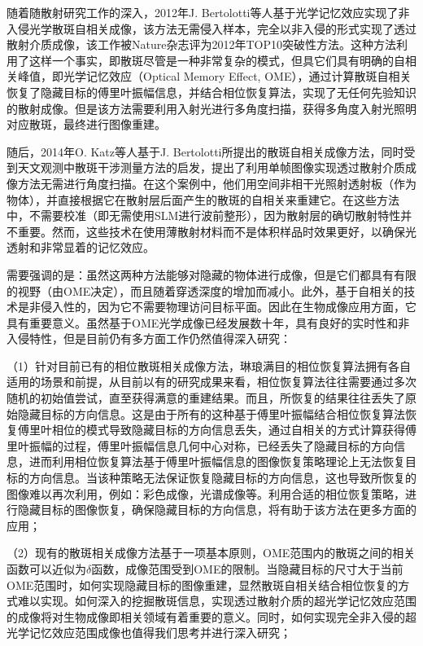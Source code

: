 随着随散射研究工作的深入，2012年J. Bertolotti等人\cite{bertolotti_non-invasive_2012}基于光学记忆效应实现了非入侵光学散斑自相关成像，该方法无需侵入样本，完全以非入侵的形式实现了透过散射介质成像，该工作被Nature杂志评为2012年TOP10突破性方法。这种方法利用了这样一个事实，即散斑尽管是一种非常复杂的模式，但具它们具有明确的自相关峰值，即光学记忆效应（Optical Memory Effect, OME）\cite{Freund1988}，通过计算散斑自相关恢复了隐藏目标的傅里叶振幅信息，并结合相位恢复算法，实现了无任何先验知识的散射成像。但是该方法需要利用入射光进行多角度扫描，获得多角度入射光照明对应散斑，最终进行图像重建。

随后，2014年O. Katz等人\cite{katz_non-invasive_2014}基于J. Bertolotti所提出的散斑自相关成像方法，同时受到天文观测中散斑干涉测量方法的启发，提出了利用单帧图像实现透过散射介质成像方法无需进行角度扫描。在这个案例中，他们用空间非相干光照射透射板（作为物体），并直接根据它在散射层后面产生的散斑的自相关来重建它。在这些方法中，不需要校准（即无需使用SLM进行波前整形），因为散射层的确切散射特性并不重要。然而，这些技术在使用薄散射材料而不是体积样品时效果更好，以确保光透射和非常显着的记忆效应。

需要强调的是：虽然这两种方法\cite{bertolotti_non-invasive_2012,katz_non-invasive_2014}能够对隐藏的物体进行成像，但是它们都具有有限的视野（由OME决定），而且随着穿透深度的增加而减小。此外，基于自相关的技术是非侵入性的，因为它不需要物理访问目标平面。因此在生物成像应用方面，它具有重要意义。虽然基于OME光学成像已经发展数十年，具有良好的实时性和非入侵特性，但是目前仍有多方面工作仍然值得深入研究：

（1）针对目前已有的相位散斑相关成像方法，琳琅满目的相位恢复算法拥有各自适用的场景和前提，从目前以有的研究成果来看，相位恢复算法往往需要通过多次随机的初始值尝试，直至获得满意的重建结果。而且，所恢复的结果往往丢失了原始隐藏目标的方向信息。这是由于所有的这种基于傅里叶振幅结合相位恢复算法恢复傅里叶相位的模式导致隐藏目标的方向信息丢失，通过自相关的方式计算获得傅里叶振幅的过程，傅里叶振幅信息几何中心对称，已经丢失了隐藏目标的方向信息，进而利用相位恢复算法基于傅里叶振幅信息的图像恢复策略理论上无法恢复目标的方向信息。当该种策略无法保证恢复隐藏目标的方向信息，这也导致所恢复的图像难以再次利用，例如：彩色成像，光谱成像等。利用合适的相位恢复策略，进行隐藏目标的图像恢复，确保隐藏目标的方向信息，将有助于该方法在更多方面的应用；

（2）现有的散斑相关成像方法基于一项基本原则，OME范围内的散斑之间的相关函数可以近似为$\delta$函数，成像范围受到OME的限制。当隐藏目标的尺寸大于当前OME范围时，如何实现隐藏目标的图像重建，显然散斑自相关结合相位恢复的方式难以实现。如何深入的挖掘散斑信息，实现透过散射介质的超光学记忆效应范围的成像将对生物成像即相关领域有着重要的意义。同时，如何实现完全非入侵的超光学记忆效应范围成像也值得我们思考并进行深入研究；

